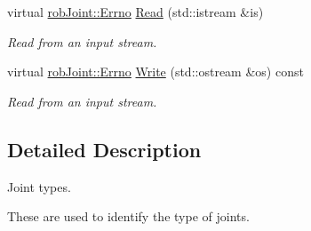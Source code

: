\begin{DoxyCompactItemize}
virtual \hyperlink{classrob_joint_a6656cb0c2f8c9aadf0c446abd6bebed7}{rob\-Joint\-::\-Errno} \hyperlink{classrob_joint_a254cec6739e7d0c9233d46064870944a}{Read} (std\-::istream \&is)
\begin{DoxyCompactList}\small\item\em Read from an input stream. \end{DoxyCompactList}\item 
virtual \hyperlink{classrob_joint_a6656cb0c2f8c9aadf0c446abd6bebed7}{rob\-Joint\-::\-Errno} \hyperlink{classrob_joint_ab15a6e370553cf232a4d49ca40bca0b2}{Write} (std\-::ostream \&os) const 
\begin{DoxyCompactList}\small\item\em Read from an input stream. \end{DoxyCompactList}\end{DoxyCompactItemize}


\subsection{Detailed Description}
Joint types. 

These are used to identify the type of joints. 

